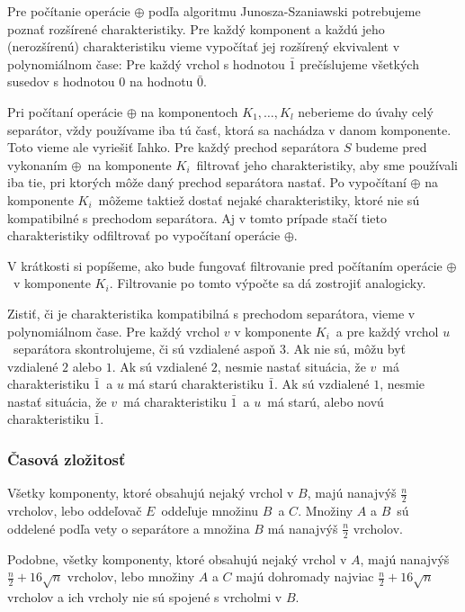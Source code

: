 Pre počítanie operácie $\oplus$ podľa algoritmu Junosza-Szaniawski potrebujeme poznať rozšírené charakteristiky.
Pre každý komponent a každú jeho (nerozšírenú) charakteristiku vieme vypočítať jej rozšírený ekvivalent v
polynomiálnom čase: Pre každý vrchol s hodnotou $\bar{1}$ prečíslujeme všetkých susedov s hodnotou $0$
na hodnotu $\bar{0}$.

Pri počítaní operácie $\oplus$ na komponentoch $K_1, \ldots, K_l$ neberieme do úvahy celý separátor,
vždy používame iba tú časť, ktorá sa nachádza v danom komponente. Toto vieme ale vyriešiť ľahko. Pre
každý prechod separátora $S$ budeme pred vykonaním $\oplus$ na komponente $K_i$ filtrovať jeho
charakteristiky, aby sme používali iba tie, pri ktorých môže daný prechod separátora nastať. Po vypočítaní
$\oplus$ na komponente $K_i$ môžeme taktiež dostať nejaké charakteristiky, ktoré nie sú kompatibilné
s prechodom separátora. Aj v tomto prípade stačí tieto charakteristiky odfiltrovať po vypočítaní
operácie $\oplus$.

V krátkosti si popíšeme, ako bude fungovať filtrovanie pred počítaním operácie $\oplus$ v komponente $K_i$.
Filtrovanie po tomto výpočte sa dá zostrojiť analogicky.

Zistiť, či je charakteristika kompatibilná s prechodom separátora, vieme v polynomiálnom čase. Pre
každý vrchol $v$ v komponente $K_i$ a pre každý vrchol $u$ separátora skontrolujeme, či sú vzdialené
aspoň $3$. Ak nie sú, môžu byť vzdialené $2$ alebo $1$. Ak sú vzdialené $2$, nesmie nastať situácia,
že $v$ má charakteristiku $\bar{1}$ a $u$ má starú charakteristiku $\bar{1}$. Ak sú vzdialené $1$,
nesmie nastať situácia, že $v$ má charakteristiku $\bar{1}$ a $u$ má starú, alebo novú charakteristiku
$\bar{1}$.

\subsubsection{Časová zložitosť}

Všetky komponenty, ktoré obsahujú nejaký vrchol v $B$, majú nanajvýš $\frac{n}{2}$ vrcholov, lebo
oddeľovač $E$ oddeľuje množinu $B$ a $C$. Množiny $A$ a $B$ sú oddelené podľa vety o separátore
a množina $B$ má nanajvýš $\frac{n}{2}$ vrcholov.

Podobne, všetky komponenty, ktoré obsahujú nejaký vrchol v $A$, majú nanajvýš $\frac{n}{2} + 16 \sqrt{n}$
vrcholov, lebo množiny $A$ a $C$ majú dohromady najviac $\frac{n}{2} + 16 \sqrt{n}$ vrcholov a ich vrcholy
nie sú spojené s vrcholmi v $B$.

